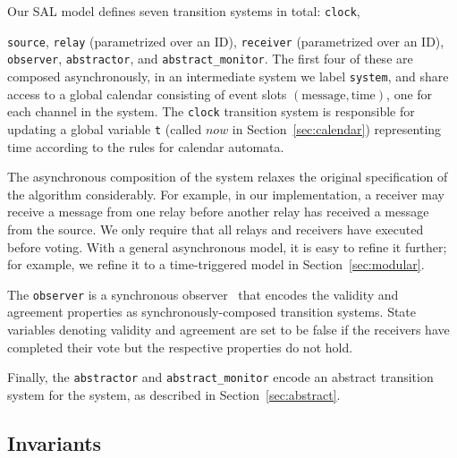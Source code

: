 \documentclass{llncs/llncs}
\begin{document}
Our SAL model defines seven transition systems in total: \texttt{clock}, {\texttt{source}, \texttt{relay} (parametrized over an ID), \texttt{receiver} (parametrized over an ID), \texttt{observer}, \texttt{abstractor}, and \texttt{abstract\_monitor}. The first four of these are composed asynchronously, in an intermediate system we label \texttt{system}, and share access to a global calendar consisting of event slots $(\text{message}, \text{time})$, one for each channel in the system. The \texttt{clock} transition system is responsible for updating a global variable \texttt{t} (called $now$ in Section~\ref{sec:calendar}) representing time according to the rules for calendar automata.

The asynchronous composition of the system relaxes the original specification of the algorithm considerably. For example, in our implementation, a receiver may receive a message from one relay before another relay has received a message from the source. We only require that all relays and receivers have executed before voting. With a general asynchronous model, it is easy to refine it further; for example, we refine it to a time-triggered model in Section~\ref{sec:modular}.

The \texttt{observer} is a synchronous observer~\cite{Rushby:SAS14} that encodes the validity and agreement properties as synchronously-composed transition systems. State variables denoting validity and agreement are set to be false if the receivers have completed their vote but the respective properties do not hold.

Finally, the \texttt{abstractor} and \texttt{abstract\_monitor} encode an abstract transition system for the system, as described in Section~\ref{sec:abstract}.


\subsection{Invariants}\label{sec:invariants}

}
\end{document}
